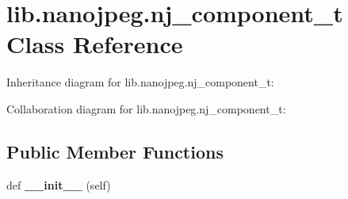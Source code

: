 \hypertarget{classlib_1_1nanojpeg_1_1nj__component__t}{}\section{lib.\+nanojpeg.\+nj\+\_\+component\+\_\+t Class Reference}
\label{classlib_1_1nanojpeg_1_1nj__component__t}


Inheritance diagram for lib.\+nanojpeg.\+nj\+\_\+component\+\_\+t\+:


Collaboration diagram for lib.\+nanojpeg.\+nj\+\_\+component\+\_\+t\+:
\subsection*{Public Member Functions}
\begin{DoxyCompactItemize}
\item 
\mbox{\label{classlib_1_1nanojpeg_1_1nj__component__t_a8dab1bd1cb098389aa4f99bf89e887ec}} 
def {\bfseries \+\_\+\+\_\+init\+\_\+\+\_\+} (self)
\end{DoxyCompactItemize}
